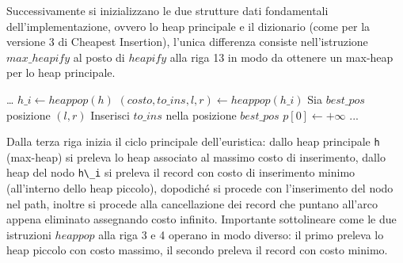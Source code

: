 \documentclass[a4paper,12pt]{report}
\begin{document}
Successivamente si inizializzano le due strutture dati fondamentali dell'implementazione, ovvero lo heap principale e il dizionario (come per la versione 3 di Cheapest Insertion), l'unica differenza consiste nell'istruzione $max\_heapify$ al posto di $heapify$ alla riga 13 in modo da ottenere un max-heap per lo heap principale. 
\begin{tcolorbox}[colframe=black, colback=white, boxrule=0.5pt, title=Furthest Insertion Versione 3, coltitle=black, fonttitle=\bfseries, colbacktitle=white, breakable]
  \begin{algorithmic}[1]
    \State \dots
      \State $h\_i \gets heappop(h)$
      \State $(costo, to\_ins, l, r) \gets heappop(h\_i)$
      \State Sia $best\_pos$ posizione $(l, r)$
      \State Inserisci $to\_ins$ nella posizione $best\_pos$
        \State $p[0] \gets +\infty$
      \EndFor
      \State ...
    \EndWhile
  \end{algorithmic}
\end{tcolorbox}
Dalla terza riga inizia il ciclo principale dell'euristica: dallo heap principale \lstinline!h! (max-heap) si preleva lo heap associato al massimo costo di inserimento, dallo heap del nodo \lstinline!h\_i! si preleva il record con costo di inserimento minimo (all'interno dello heap piccolo), dopodiché si procede con l'inserimento del nodo nel path, inoltre si procede alla cancellazione dei record che puntano all'arco appena eliminato assegnando costo infinito. Importante sottolineare come le due istruzioni $heappop$ alla riga 3 e 4 operano in modo diverso: il primo preleva lo heap piccolo con costo massimo, il secondo preleva il record con costo minimo.
\end{document}
